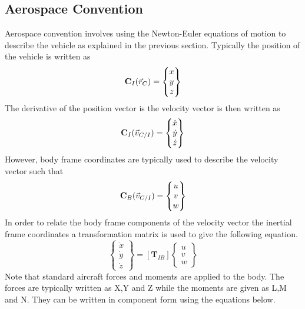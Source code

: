 \documentclass{article}
\begin{document}
\subsection{Aerospace Convention}

Aerospace convention involves using the Newton-Euler equations of
motion to describe the vehicle\cite{etkins} as explained in the
previous section. Typically the position of the
vehicle is written as 
\begin{equation}
{\bf C}_I(\vec{r}_C) = \begin{Bmatrix} x \\ y \\ z \end{Bmatrix}
\end{equation}
The derivative of the position vector is the velocity vector is then
written as
\begin{equation}
{\bf C}_I(\vec{v}_{C/I}) = \begin{Bmatrix} \dot{x} \\ \dot{y} \\ \dot{z} \end{Bmatrix}
\end{equation}
However, body frame coordinates are typically used to
describe the velocity vector such that
\begin{equation}
{\bf C}_B(\vec{v}_{C/I}) = \begin{Bmatrix} u \\ v \\ w \end{Bmatrix}
\end{equation}
In order to relate the body frame components of the velocity vector
the inertial frame coordinates a transformation matrix is used to give
the following equation.
\begin{equation}\label{e:xyzdot}
\begin{Bmatrix} \dot{x} \\ \dot{y} \\ \dot{z}   \end{Bmatrix} = [\textbf{T}_{IB}]
\begin{Bmatrix} u \\ v \\ w \end{Bmatrix}
\end{equation}
Note that standard aircraft forces and moments are applied to the
body. The forces are typically written as X,Y and Z while the moments
are given as L,M and N. They can be written in component form using
the equations below.
\end{document}
